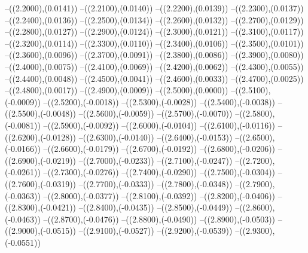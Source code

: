 {	--({\sx*(2.2000)},{\sy*(0.0141)})
	--({\sx*(2.2100)},{\sy*(0.0140)})
	--({\sx*(2.2200)},{\sy*(0.0139)})
	--({\sx*(2.2300)},{\sy*(0.0137)})
	--({\sx*(2.2400)},{\sy*(0.0136)})
	--({\sx*(2.2500)},{\sy*(0.0134)})
	--({\sx*(2.2600)},{\sy*(0.0132)})
	--({\sx*(2.2700)},{\sy*(0.0129)})
	--({\sx*(2.2800)},{\sy*(0.0127)})
	--({\sx*(2.2900)},{\sy*(0.0124)})
	--({\sx*(2.3000)},{\sy*(0.0121)})
	--({\sx*(2.3100)},{\sy*(0.0117)})
	--({\sx*(2.3200)},{\sy*(0.0114)})
	--({\sx*(2.3300)},{\sy*(0.0110)})
	--({\sx*(2.3400)},{\sy*(0.0106)})
	--({\sx*(2.3500)},{\sy*(0.0101)})
	--({\sx*(2.3600)},{\sy*(0.0096)})
	--({\sx*(2.3700)},{\sy*(0.0091)})
	--({\sx*(2.3800)},{\sy*(0.0086)})
	--({\sx*(2.3900)},{\sy*(0.0080)})
	--({\sx*(2.4000)},{\sy*(0.0075)})
	--({\sx*(2.4100)},{\sy*(0.0069)})
	--({\sx*(2.4200)},{\sy*(0.0062)})
	--({\sx*(2.4300)},{\sy*(0.0055)})
	--({\sx*(2.4400)},{\sy*(0.0048)})
	--({\sx*(2.4500)},{\sy*(0.0041)})
	--({\sx*(2.4600)},{\sy*(0.0033)})
	--({\sx*(2.4700)},{\sy*(0.0025)})
	--({\sx*(2.4800)},{\sy*(0.0017)})
	--({\sx*(2.4900)},{\sy*(0.0009)})
	--({\sx*(2.5000)},{\sy*(0.0000)})
	--({\sx*(2.5100)},{\sy*(-0.0009)})
	--({\sx*(2.5200)},{\sy*(-0.0018)})
	--({\sx*(2.5300)},{\sy*(-0.0028)})
	--({\sx*(2.5400)},{\sy*(-0.0038)})
	--({\sx*(2.5500)},{\sy*(-0.0048)})
	--({\sx*(2.5600)},{\sy*(-0.0059)})
	--({\sx*(2.5700)},{\sy*(-0.0070)})
	--({\sx*(2.5800)},{\sy*(-0.0081)})
	--({\sx*(2.5900)},{\sy*(-0.0092)})
	--({\sx*(2.6000)},{\sy*(-0.0104)})
	--({\sx*(2.6100)},{\sy*(-0.0116)})
	--({\sx*(2.6200)},{\sy*(-0.0128)})
	--({\sx*(2.6300)},{\sy*(-0.0140)})
	--({\sx*(2.6400)},{\sy*(-0.0153)})
	--({\sx*(2.6500)},{\sy*(-0.0166)})
	--({\sx*(2.6600)},{\sy*(-0.0179)})
	--({\sx*(2.6700)},{\sy*(-0.0192)})
	--({\sx*(2.6800)},{\sy*(-0.0206)})
	--({\sx*(2.6900)},{\sy*(-0.0219)})
	--({\sx*(2.7000)},{\sy*(-0.0233)})
	--({\sx*(2.7100)},{\sy*(-0.0247)})
	--({\sx*(2.7200)},{\sy*(-0.0261)})
	--({\sx*(2.7300)},{\sy*(-0.0276)})
	--({\sx*(2.7400)},{\sy*(-0.0290)})
	--({\sx*(2.7500)},{\sy*(-0.0304)})
	--({\sx*(2.7600)},{\sy*(-0.0319)})
	--({\sx*(2.7700)},{\sy*(-0.0333)})
	--({\sx*(2.7800)},{\sy*(-0.0348)})
	--({\sx*(2.7900)},{\sy*(-0.0363)})
	--({\sx*(2.8000)},{\sy*(-0.0377)})
	--({\sx*(2.8100)},{\sy*(-0.0392)})
	--({\sx*(2.8200)},{\sy*(-0.0406)})
	--({\sx*(2.8300)},{\sy*(-0.0421)})
	--({\sx*(2.8400)},{\sy*(-0.0435)})
	--({\sx*(2.8500)},{\sy*(-0.0449)})
	--({\sx*(2.8600)},{\sy*(-0.0463)})
	--({\sx*(2.8700)},{\sy*(-0.0476)})
	--({\sx*(2.8800)},{\sy*(-0.0490)})
	--({\sx*(2.8900)},{\sy*(-0.0503)})
	--({\sx*(2.9000)},{\sy*(-0.0515)})
	--({\sx*(2.9100)},{\sy*(-0.0527)})
	--({\sx*(2.9200)},{\sy*(-0.0539)})
	--({\sx*(2.9300)},{\sy*(-0.0551)})
}
